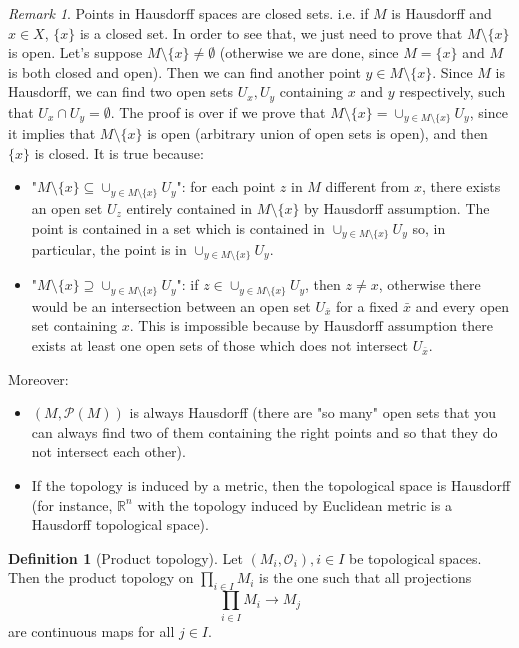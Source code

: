 \documentclass[a4paper,11pt,titlepage]{article}
\numberwithin{equation}{section}
\theoremstyle{definition}
\newtheorem{definition}[theorem]{Definition}
\theoremstyle{remark}
\newtheorem{remark}[theorem]{Remark}
\newcommand{\rfield}{\mathbb{R}}
\begin{document}
\begin{remark}
Points in Hausdorff spaces are closed sets. i.e. if $M$ is Hausdorff and $x \in X$, $\{x\}$ is a closed set. In order to see that, we just need to prove that $M \setminus \{x\}$ is open. Let's suppose $M \setminus \{x\} \not = \emptyset$ (otherwise we are done, since $M = \{x\}$ and $M$ is both closed and open). Then we can find another point $y \in M \setminus \{x\}$. Since $M$ is Hausdorff, we can find two open sets $U_x, U_y$ containing $x$ and $y$ respectively, such that $U_x \cap U_y = \emptyset$. The proof is over if we prove that $M \setminus \{x\} = \cup_{y \in M \setminus \{x\}} U_y$, since it implies that $M \setminus \{x\}$ is open (arbitrary union of open sets is open), and then $\{x\}$ is closed. It is true because:
\begin{itemize}
\item "$M \setminus \{x\} \subseteq  \cup_{y \in M \setminus \{x\}} U_y$": for each point $z$ in $M$ different from $x$, there exists an open set $U_z$ entirely contained in $M \setminus \{x\}$ by Hausdorff assumption. The point is contained in a set which is contained in $\cup_{y \in M \setminus \{x\}} U_y$ so, in particular, the point is in $\cup_{y \in M \setminus \{x\}} U_y$.
\item "$M \setminus \{x\} \supseteq \cup_{y \in M \setminus \{x\}} U_y$": if $z \in \cup_{y \in M \setminus \{x\}} U_y$, then $z \not = x$, otherwise there would be an intersection between an open set $U_{\bar x}$ for a fixed $\bar x$ and every open set containing $x$. This is impossible because by Hausdorff assumption there exists at least one open sets of those which does not intersect $U_{\bar x}$.
\end{itemize}

Moreover: 
\begin{itemize}
	\item $(M, \mathcal{P}(M))$ is always Hausdorff (there are "so many" open sets that you can always find two of them containing the right points and so that they do not intersect each other).
	\item If the topology is induced by a metric, then the topological space is Hausdorff (for instance, $\rfield^n$ with the topology induced by Euclidean metric is a Hausdorff topological space).
\end{itemize}
\end{remark}

\begin{definition}[Product topology]
Let $(M_i, \mathcal{O}_i), i \in I$ be topological spaces. Then the product topology on $\prod_{i \in I} M_i$ is the one such that all projections
$$
\prod_{i \in I} M_i \rightarrow M_j
$$
are continuous maps for all $j \in I$.
\end{definition}
\end{document}
